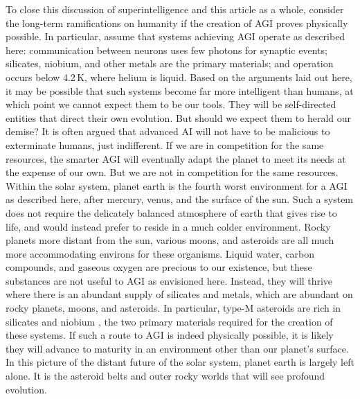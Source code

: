 To close this discussion of superintelligence and this article as a whole, consider the long-term ramifications on humanity if the creation of AGI proves physically possible. In particular, assume that systems achieving AGI operate as described here: communication between neurons uses few photons for synaptic events; silicates, niobium, and other metals are the primary materials; and operation occurs below 4.2\,K, where helium is liquid. Based on the arguments laid out here, it may be possible that such systems become far more intelligent than humans, at which point we cannot expect them to be our tools. They will be self-directed entities that direct their own evolution. But should we expect them to herald our demise? It is often argued that advanced AI will not have to be malicious to exterminate humans, just indifferent. If we are in competition for the same resources, the smarter AGI will eventually adapt the planet to meet its needs at the expense of our own. But we are not in competition for the same resources. Within the solar system, planet earth is the fourth worst environment for a AGI as described here, after mercury, venus, and the surface of the sun. Such a system does not require the delicately balanced atmosphere of earth that gives rise to life, and would instead prefer to reside in a much colder environment. Rocky planets more distant from the sun, various moons, and asteroids are all much more accommodating environs for these organisms. Liquid water, carbon compounds, and gaseous oxygen are precious to our existence, but these substances are not useful to AGI as envisioned here. Instead, they will thrive where there is an abundant supply of silicates and metals, which are abundant on rocky planets, moons, and asteroids. In particular, type-M asteroids are rich in silicates \cite{} and niobium \cite{}, the two primary materials required for the creation of these systems. If such a route to AGI is indeed physically possible, it is likely they will advance to maturity in an environment other than our planet's surface. In this picture of the distant future of the solar system, planet earth is largely left alone. It is the asteroid belts and outer rocky worlds that will see profound evolution.
 